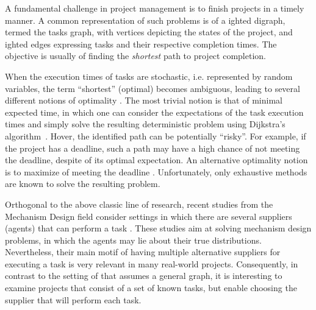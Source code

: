 \documentclass[letterpaper]{article} %
\newcommand\Roni[1]{\nb{\textbf{Roni:}}{blue}{#1}}
\begin{document}

A fundamental challenge in project management is to finish projects in a timely manner. A common representation of such problems is of a ighted digraph, termed the tasks graph, with vertices depicting the states of the project, and ighted edges expressing tasks and their respective completion times. The objective is usually of finding the \emph{shortest} path to project completion.

When the execution times of tasks are stochastic, i.e. represented by random variables, the term ``shortest'' (optimal) becomes ambiguous, leading to several different notions of optimality \cite{loui1983optimal}.
The most trivial notion is that of minimal expected time, in which one can consider the expectations of the task execution times and simply solve the resulting deterministic problem using Dijkstra's algorithm~\cite{dijkstra1959note}. Hover, the identified path can be potentially ``risky''. For example, if the project has a deadline, such a path may have a high chance of not meeting the deadline, despite  of its optimal expectation. An alternative optimality notion is to maximize of meeting the deadline \cite{frank1969shortest}. Unfortunately, only exhaustive methods are known to solve the resulting problem. %

Orthogonal to the above classic line of research, recent studies from the Mechanism Design field consider settings in which there are several suppliers (agents) that can perform a task \cite{porter2008fault,conitzer2014mechanism}. These studies aim at solving mechanism design problems, in which the agents may lie about their true distributions. Nevertheless, their main motif of having multiple alternative suppliers for executing a task is very relevant in many real-world projects. Consequently, in contrast to the setting of \citeauthor{loui1983optimal} that assumes a general graph, it is interesting to examine projects that consist of a set of known tasks, but enable choosing the supplier that will perform each task.
\end{document}
